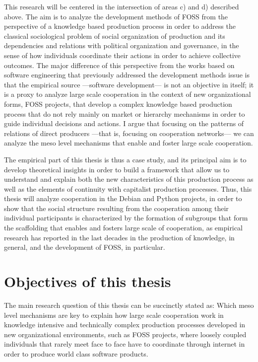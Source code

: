 This research will be centered in the intersection of areas c) and d) described above. The aim is to analyze the development methods of FOSS from the perspective of a knowledge based production process in order to address the classical sociological problem of social organization of production and its dependencies and relations with political organization and governance, in the sense of how individuals coordinate their actions in order to achieve collective outcomes. The major difference of this perspective from the works based on software engineering that previously addressed the development methods issue is that the empirical source ---software development--- is not an objective in itself; it is a proxy to analyze large scale cooperation in the context of new organizational forms, FOSS projects, that develop a complex knowledge based production process that do not rely mainly on market or hierarchy mechanisms in order to guide individual decisions and actions. I argue that focusing on the patterns of relations of direct producers ---that is, focusing on cooperation networks--- we can analyze the meso level mechanisms that enable and foster large scale cooperation.

The empirical part of this thesis is thus a case study, and its principal aim is to develop theoretical insights in order to build a framework that allow us to understand and explain both the new characteristics of this production process as well as the elements of continuity with capitalist production processes. Thus, this thesis will analyze cooperation in the Debian and Python projects, in order to show that the social structure resulting from the cooperation among their individual participants is characterized by the formation of subgroups that form the scaffolding that enables and fosters large scale of cooperation, as empirical research has reported in the last decades in the production of knowledge, in general, and the development of FOSS, in particular.

\section{Objectives of this thesis}

The main research question of this thesis can be succinctly stated as: Which meso level mechanisms are key to explain how large scale cooperation work in knowledge intensive and technically complex production processes developed in new organizational environments, such as FOSS projects, where loosely coupled individuals that rarely meet face to face have to coordinate through internet in order to produce world class software products.

